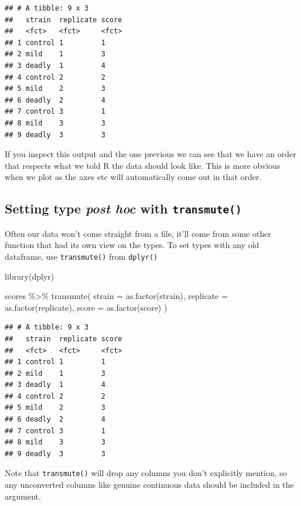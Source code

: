\documentclass[
]{book}
\newenvironment{Shaded}{\begin{snugshade}}{\end{snugshade}}
\newcommand{\AttributeTok}[1]{\textcolor[rgb]{0.77,0.63,0.00}{#1}}
\newcommand{\FunctionTok}[1]{\textcolor[rgb]{0.00,0.00,0.00}{#1}}
\newcommand{\NormalTok}[1]{#1}
\newcommand{\SpecialCharTok}[1]{\textcolor[rgb]{0.00,0.00,0.00}{#1}}
\begin{document}
\begin{verbatim}
## # A tibble: 9 x 3
##   strain  replicate score
##   <fct>   <fct>     <fct>
## 1 control 1         1    
## 2 mild    1         3    
## 3 deadly  1         4    
## 4 control 2         2    
## 5 mild    2         3    
## 6 deadly  2         4    
## 7 control 3         1    
## 8 mild    3         3    
## 9 deadly  3         3
\end{verbatim}

If you inspect this output and the one previous we can see that we have an order that respects what we told R the data should look like. This is more obvious when we plot as the axes etc will automatically come out in that order.

\hypertarget{setting-type-post-hoc-with-transmute}{%
\subsection{\texorpdfstring{Setting type \emph{post hoc} with \texttt{transmute()}}{Setting type post hoc with transmute()}}\label{setting-type-post-hoc-with-transmute}}

Often our data won't come straight from a file, it'll come from some other function that had its own view on the types. To set types with any old dataframe, use \texttt{transmute()} from \texttt{dplyr()}

\begin{Shaded}
\begin{Highlighting}[]
\FunctionTok{library}\NormalTok{(dplyr)}

\NormalTok{scores }\SpecialCharTok{\%\textgreater{}\%} \FunctionTok{transmute}\NormalTok{(}
  \AttributeTok{strain =} \FunctionTok{as.factor}\NormalTok{(strain),}
  \AttributeTok{replicate =} \FunctionTok{as.factor}\NormalTok{(replicate),}
  \AttributeTok{score =} \FunctionTok{as.factor}\NormalTok{(score)}
\NormalTok{)}
\end{Highlighting}
\end{Shaded}

\begin{verbatim}
## # A tibble: 9 x 3
##   strain  replicate score
##   <fct>   <fct>     <fct>
## 1 control 1         1    
## 2 mild    1         3    
## 3 deadly  1         4    
## 4 control 2         2    
## 5 mild    2         3    
## 6 deadly  2         4    
## 7 control 3         1    
## 8 mild    3         3    
## 9 deadly  3         3
\end{verbatim}

Note that \texttt{transmute()} will drop any columns you don't explicitly mention, so any unconverted columns like genuine continuous data should be included in the argument.
\end{document}
